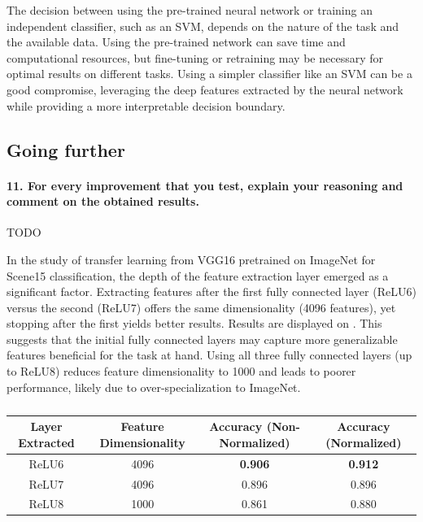 The decision between using the pre-trained neural network or training an independent classifier, such as an SVM, depends on the nature of the task and the available data. Using the pre-trained network can save time and computational resources, but fine-tuning or retraining may be necessary for optimal results on different tasks. Using a simpler classifier like an SVM can be a good compromise, leveraging the deep features extracted by the neural network while providing a more interpretable decision boundary.

\subsection{Going further}
\paragraph*{11. For every improvement that you test, explain your reasoning and comment on the obtained results.}
TODO

In the study of transfer learning from VGG16 pretrained on ImageNet for Scene15 classification, the depth of the feature extraction layer emerged as a significant factor. Extracting features after the first fully connected layer (ReLU6) versus the second (ReLU7) offers the same dimensionality (4096 features), yet stopping after the first yields better results. Results are displayed on . This suggests that the initial fully connected layers may capture more generalizable features beneficial for the task at hand. Using all three fully connected layers (up to ReLU8) reduces feature dimensionality to 1000 and leads to poorer performance, likely due to over-specialization to ImageNet. 

\begin{table}[!htpb]
    \centering
    \begin{tabular}{@{}cccc@{}}
        \toprule
        \textbf{Layer Extracted} & \textbf{Feature Dimensionality} & \textbf{Accuracy (Non-Normalized)} & \textbf{Accuracy (Normalized)} \\
        \midrule \midrule
        ReLU6 & 4096            & \textbf{0.906}         & \textbf{0.912} \\
        ReLU7 & 4096            & 0.896                  & 0.896          \\
        ReLU8 & 1000            & 0.861                  & 0.880          \\
        \bottomrule
    \end{tabular}
    \caption{}
    \label{tab:depth_influence}
\end{table}

